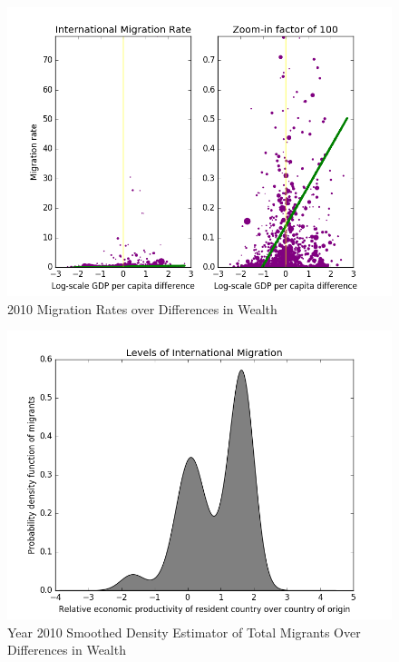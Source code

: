 \documentclass{acm_proc_article-sp}
\begin{document}
\begin{figure}[ht]
    \includegraphics[width=\columnwidth, keepaspectratio=true]{GDP_regression_2010.png}
    \caption{2010 Migration Rates over Differences in Wealth}
    \label{fig:reg2010}
\end{figure}

\begin{figure}[ht]
    \includegraphics[width=\columnwidth, keepaspectratio=true]{Smoothed_Density_Estimator2010.png}
    \caption{Year 2010 Smoothed Density Estimator of Total Migrants Over Differences in Wealth}
    \label{fig:kern2010}
\end{figure}
\end{document}
